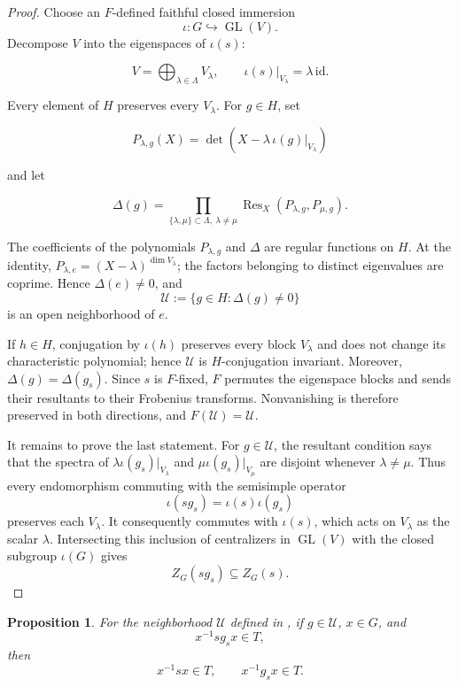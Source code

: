 \documentclass[11pt,letterpaper]{amsart}
\newtheorem{proposition}[theorem]{Proposition}
\theoremstyle{definition}
\numberwithin{equation}{section}
\numberwithin{theorem}{section}
\begin{document}
\begin{proof}
Choose an $F$-defined faithful closed immersion
\[
\iota:G\hookrightarrow \operatorname{GL}(V).
\]
Decompose $V$ into the eigenspaces of $\iota(s)$:

\[
V=\bigoplus_{\lambda\in\Lambda}V_\lambda,
\qquad \iota(s)|_{V_\lambda}=\lambda\,\mathrm{id}.
\]

Every element of $H$ preserves every $V_\lambda$. For $g\in H$, set

\[
P_{\lambda,g}(X)
 =\det\!\left(X-\lambda\,\iota(g)|_{V_\lambda}\right)
\]

and let

\[
\Delta(g)=\prod_{\{\lambda,\mu\}\subset\Lambda,\ \lambda\ne\mu}
 \operatorname{Res}_X(P_{\lambda,g},P_{\mu,g}).
\]

The coefficients of the polynomials $P_{\lambda,g}$ and $\Delta$
are regular functions on $H$. At the identity,
$P_{\lambda,e}=(X-\lambda)^{\dim V_\lambda}$; the factors belonging to distinct eigenvalues are coprime. Hence $\Delta(e)\ne0$, and
\[
\mathcal U:=\{g\in H:\Delta(g)\ne0\}
\]
is an open neighborhood of $e$.

If $h\in H$, conjugation by $\iota(h)$ preserves every block $V_\lambda$ and
does not change its characteristic polynomial; hence $\mathcal U$ is
$H$-conjugation invariant. Moreover, $\Delta(g)=\Delta(g_s)$. Since $s$ is $F$-fixed, $F$ permutes the eigenspace
blocks and sends their resultants to their Frobenius transforms. Nonvanishing
is therefore preserved in both directions, and $F(\mathcal U)=\mathcal U$.

It remains to prove the last statement. For $g\in\mathcal U$, the resultant
condition says that the spectra of
$\lambda\iota(g_s)|_{V_\lambda}$ and
$\mu\iota(g_s)|_{V_\mu}$ are disjoint whenever $\lambda\ne\mu$. Thus every
endomorphism commuting with the semisimple operator
\[
\iota(sg_s)=\iota(s)\iota(g_s)
\]
preserves each $V_\lambda$. It consequently commutes with $\iota(s)$, which
acts on $V_\lambda$ as the scalar $\lambda$. Intersecting this inclusion of
centralizers in $\operatorname{GL}(V)$ with the closed subgroup $\iota(G)$
gives
\[
Z_{G}(sg_s)\subseteq Z_{G}(s).
\]
\end{proof}

\begin{proposition}\label{Tsep}
For the neighborhood $\mathcal U$ defined in , if
$g\in\mathcal U$, $x\in G$, and
\[
x^{-1}s g_s x\in T,
\]
then
\[
x^{-1}s x\in T,
\qquad
x^{-1}g_sx\in T.
\]
\end{proposition}
\end{document}
